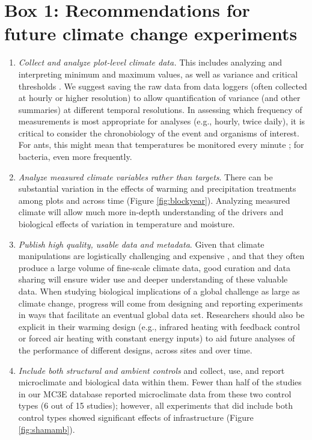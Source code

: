 \documentclass{article}
\begin{document}
\section* {Box 1: Recommendations for future climate change experiments} 
\begin{enumerate}
\item\textit{Collect and analyze plot-level climate data.} This includes analyzing and interpreting minimum and maximum values, as well as variance and critical thresholds \citep[e.g., the number and duration of freeze-thaw events and accumulated chilling hours,][]{mcdaniel2014,vasseur2014}. We suggest saving the raw data from data loggers (often collected at hourly or higher resolution) to allow quantification of variance (and other summaries) at different temporal resolutions. In assessing which frequency of measurements is most appropriate for analyses (e.g., hourly, twice daily), it is critical to consider the chronobiology of the event and organisms of interest. For ants, this might mean that temperatures be monitored every minute \citep{shavit2017}; for bacteria, even more frequently. 
\item\textit{Analyze measured climate variables rather than targets}. There can be substantial variation in the effects of warming and precipitation treatments among plots and across time (Figure \ref{fig:blockyear}). Analyzing measured climate will allow much more in-depth understanding of the drivers and biological effects of variation in temperature and moisture.
\item\textit{Publish high quality, usable data and metadata}. Given that climate manipulations are logistically challenging and expensive \citep{aronson2009}, and that they often produce a large volume of fine-scale climate data, good curation and data sharing will ensure wider use and deeper understanding of these valuable data. When studying biological implications of a global challenge as large as climate change, progress will come from designing and reporting experiments in ways that facilitate an eventual global data set. Researchers should also be explicit in their warming design (e.g., infrared heating with feedback control or forced air heating with constant energy inputs) to aid future analyses of the performance of different designs, across sites and over time.   
\item\textit{Include both structural and ambient controls} and collect, use, and report microclimate and biological data within them. Fewer than half of the studies in our MC3E database reported microclimate data from these two control types (6 out of 15 studies); however, all experiments that did include both control types showed significant effects of infrastructure (Figure \ref{fig:shamamb}).

\end{enumerate}
\end{document}
